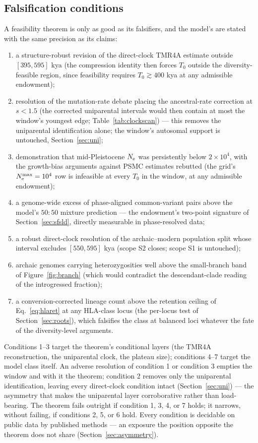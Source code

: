 \subsection{Falsification conditions}
A feasibility theorem is only as good as its falsifiers, and the model's
are stated with the same precision as its claims:
\begin{enumerate}
\item a structure-robust revision of the direct-clock TMR4A estimate
outside $[395, 595]$ kya (the compression identity then forces
$T_0$ outside the diversity-feasible region, since feasibility requires
$T_0 \gtrsim 400$ kya at any admissible endowment);
\item resolution of the mutation-rate debate placing the ancestral-rate
correction at $s < 1.5$ (the corrected uniparental intervals would then
contain at most the window's youngest edge; Table~\ref{tab:clockscan}) ---
this removes the uniparental identification alone; the window's autosomal
support is untouched, Section~\ref{sec:uni};
\item demonstration that mid-Pleistocene $N_{\mathrm{e}}$ was persistently below
$2\times10^{4}$, with the growth-bias arguments against PSMC estimates
rebutted (the grid's $N_{\mathrm{e}}^{\max} = 10^{4}$ row is infeasible at every
$T_0$ in the window, at any admissible endowment);
\item a genome-wide excess of phase-aligned common-variant pairs above the
model's $50{:}50$ mixture prediction --- the endowment's two-point
signature of Section~\ref{sec:sfsld}, directly measurable in
phase-resolved data;
\item a robust direct-clock resolution of the archaic--modern population
split whose interval excludes $[550, 595]$ kya (scope S2 closes; scope S1
is untouched);
\item archaic genomes carrying heterozygosities well above the
small-branch band of Figure~\ref{fig:branch} (which would contradict the
descendant-clade reading of the introgressed fraction);
\item a conversion-corrected lineage count above the retention ceiling of
Eq.~\eqref{eq:hlaret} at any HLA-class locus (the per-locus test of
Section~\ref{sec:roots}), which falsifies the class at balanced loci
whatever the fate of the diversity-level arguments.
\end{enumerate}
Conditions 1--3 target the theorem's conditional layers (the TMR4A
reconstruction, the uniparental clock, the plateau size); conditions
4--7 target the model class itself. An adverse resolution of condition 1
or condition 3 empties the window and with it the theorem; condition 2
removes only the uniparental identification, leaving every direct-clock
condition intact (Section~\ref{sec:uni}) --- the asymmetry that makes the
uniparental layer corroborative rather than load-bearing. The theorem
fails outright if condition 1, 3, 4, or 7 holds; it narrows, without
failing, if conditions 2, 5, or 6 hold. Every condition is decidable on
public data by published methods --- an exposure the position opposite
the theorem does not share (Section~\ref{sec:asymmetry}).

